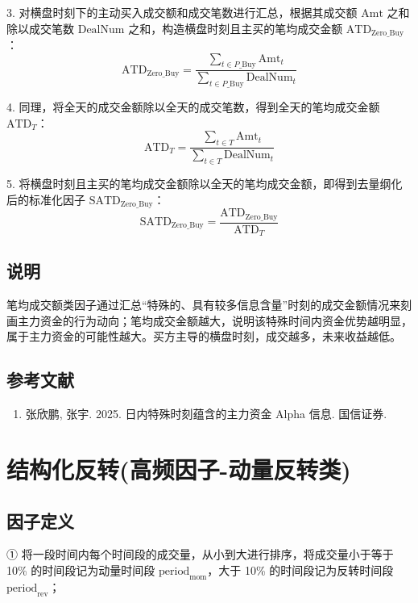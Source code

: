 \documentclass{article}
\begin{document}
3. 对横盘时刻下的主动买入成交额和成交笔数进行汇总，根据其成交额 \( \mathrm{Amt} \) 之和除以成交笔数 \( \mathrm{DealNum}\) 之和，构造横盘时刻且主买的笔均成交金额 \( \mathrm{ATD}_{\mathrm{Zero\_Buy}} \)：
\begin{equation}
    \mathrm{ATD}_{\mathrm{Zero\_Buy}} = \frac{\sum_{t \in P\_\mathrm{Buy}} \mathrm{Amt}_t}{\sum_{t \in P\_\mathrm{Buy}} \mathrm{DealNum}_t}
\end{equation}

4. 同理，将全天的成交金额除以全天的成交笔数，得到全天的笔均成交金额 \( \mathrm{ATD}_T \)：
\begin{equation}
    \mathrm{ATD}_T = \frac{\sum_{t \in T} \mathrm{Amt}_t}{\sum_{t \in T} \mathrm{DealNum}_t}
\end{equation}

5. 将横盘时刻且主买的笔均成交金额除以全天的笔均成交金额，即得到去量纲化后的标准化因子 \( \mathrm{SATD}_{\mathrm{Zero\_Buy}} \)：
\begin{equation}
    \mathrm{SATD}_{\mathrm{Zero\_Buy}} = \frac{\mathrm{ATD}_{\mathrm{Zero\_Buy}}}{\mathrm{ATD}_T}
\end{equation}

\subsection{说明}
笔均成交额类因子通过汇总“特殊的、具有较多信息含量”时刻的成交金额情况来刻画主力资金的行为动向；笔均成交金额越大，说明该特殊时间内资金优势越明显，属于主力资金的可能性越大。买方主导的横盘时刻，成交越多，未来收益越低。

\subsection{参考文献}
\begin{enumerate}
    \item 张欣鹏, 张宇. 2025. 日内特殊时刻蕴含的主力资金 Alpha 信息. 国信证券.
\end{enumerate}

\section{结构化反转(高频因子-动量反转类)}

\subsection{因子定义}

① 将一段时间内每个时间段的成交量，从小到大进行排序，将成交量小于等于 10\% 的时间段记为动量时间段 \(\mathrm{period}_{\mathrm{mom}}\)，大于 10\% 的时间段记为反转时间段 \(\mathrm{period}_{\mathrm{rev}}\)；
\end{document}
